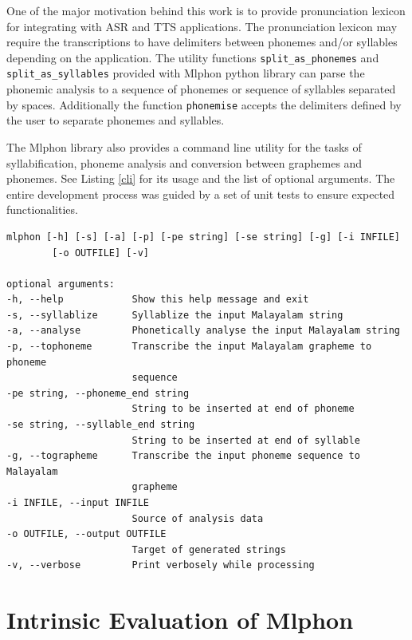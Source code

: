 One of the major motivation behind this work is to provide pronunciation
lexicon for integrating with ASR and TTS applications. The pronunciation
lexicon may require the transcriptions to have delimiters between phonemes
and/or syllables depending on the application. The utility functions
\texttt{split\_as\_phonemes} and \texttt{split\_as\_syllables} provided with
Mlphon python library can parse the phonemic analysis to a sequence of phonemes
or sequence of syllables separated by spaces. Additionally the function
\texttt{phonemise} accepts the delimiters defined by the user to separate
phonemes and syllables.

The Mlphon library also provides a command line utility for the tasks of
syllabification, phoneme analysis and conversion between graphemes and
phonemes. See Listing \ref{cli} for its usage and the list of optional
arguments. The entire development process was guided by a set of unit tests to
ensure expected functionalities.

\begin{lstlisting}[frame=tb,
	caption= Command line utility for Mlphon library,
	label={cli},
	basicstyle=\ttfamily\footnotesize
	]
mlphon [-h] [-s] [-a] [-p] [-pe string] [-se string] [-g] [-i INFILE]
        [-o OUTFILE] [-v]

optional arguments:
-h, --help            Show this help message and exit
-s, --syllablize      Syllablize the input Malayalam string
-a, --analyse         Phonetically analyse the input Malayalam string
-p, --tophoneme       Transcribe the input Malayalam grapheme to phoneme
                      sequence
-pe string, --phoneme_end string
                      String to be inserted at end of phoneme
-se string, --syllable_end string
                      String to be inserted at end of syllable
-g, --tographeme      Transcribe the input phoneme sequence to Malayalam
                      grapheme
-i INFILE, --input INFILE
                      Source of analysis data
-o OUTFILE, --output OUTFILE
                      Target of generated strings
-v, --verbose         Print verbosely while processing
\end{lstlisting}

\section{Intrinsic Evaluation of Mlphon}
\label{goldlexicon}

